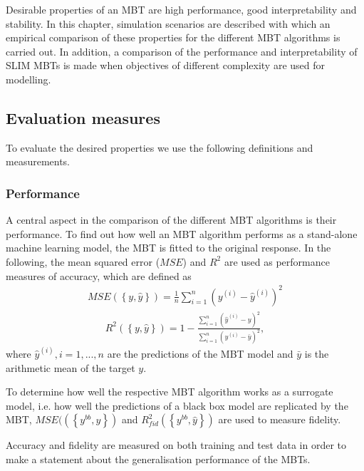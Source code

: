 Desirable properties of an MBT are high performance, good interpretability and stability.
In this chapter, simulation scenarios are described with which an empirical comparison of these properties for the different MBT algorithms is carried out.
In addition, a comparison of the performance and interpretability of SLIM MBTs is made when objectives of different complexity are used for modelling.

\subsection{Evaluation measures}
To evaluate the desired properties we use the following definitions and measurements.

\subsubsection{Performance}
A central aspect in the comparison of the different MBT algorithms is their performance. 
To find out how well an MBT algorithm performs as a stand-alone machine learning model, the MBT is fitted to the original response. 
In the following, the mean squared error ($MSE$) and $R^2$ are used as performance measures of accuracy, which are defined as
\begin{align}
    MSE \left( \left\{y, \hat{y}\right\}\right) = \frac{1}{n}\sum_{i = 1}^{n}\left(y^{(i)}-\hat{y}^{(i)}\right)^2
\end{align}
\begin{align}
    R^2\left( \left\{y, \hat{y}\right\}\right) = 1-\frac{\sum_{i = 1}^{n}\left(\hat{y}^{(i) } - y\right)^2}{\sum_{i = 1}^{n}\left(y^{(i)} - \bar{y}\right)^2},
\end{align}
where $\hat{y}^{(i)}, i = 1,...,n$ are the predictions of the MBT model and $\bar{y}$ is the arithmetic mean of the target $y$.

To determine how well the respective MBT algorithm works as a surrogate model, i.e. how well the predictions of a black box model are replicated by the MBT, $MSE(\left( \left\{y^{bb}, \hat{y}\right\}\right)$ and $R^2_{fid}\left( \left\{y^{bb}, \hat{y}\right\}\right)$ are used to measure fidelity. 

Accuracy and fidelity are measured on both training and test data in order to make a statement about the generalisation performance of the MBTs.

\vspace{0.5cm}
